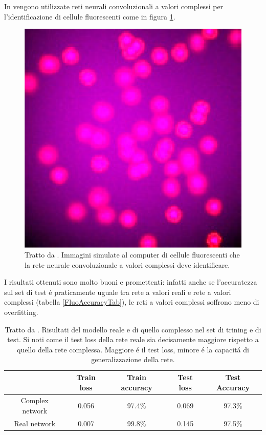 \documentclass[a4paper,12pt]{report}
\begin{document}
 In \cite{guberman2016complex} vengono utilizzate reti neurali convoluzionali a valori complessi per l'identificazione di cellule fluorescenti come in figura \ref{FluoCellpng}.
 \begin{figure}[h!]
  \centering
  \includegraphics[scale=0.35]{FluoCell.png}
  \caption{Tratto da \cite{guberman2016complex}. Immagini simulate al computer di cellule fluorescenti che la rete neurale convoluzionale a valori complessi deve identificare.}
  \label{FluoCellpng}
 \end{figure}
 
 I risultati ottenuti sono molto buoni e promettenti: infatti anche se l'accuratezza sul set di test \'e praticamente uguale tra rete a valori reali e rete a valori complessi (tabella \ref{FluoAccuracyTab}), le reti a valori complessi soffrono meno di overfitting.
 \begin{table}[h]
  \centering
  \begin{tabular}{|c|c|c|c|c|}
   \hline
    & Train loss & Train accuracy & Test loss & Test Accuracy \\
    \hline
    Complex network & 0.056 & 97.4\% & 0.069 & 97.3\% \\
    \hline
    Real network & 0.007 & 99.8\% & 0.145 & 97.5\% \\
    \hline
  \end{tabular}
  \caption{Tratto da \cite{guberman2016complex}. Risultati del modello reale e di quello complesso nel set di trining e di test. Si noti come il test loss della rete reale sia decisamente maggiore rispetto a quello della rete complessa. Maggiore \'e il test loss, minore \'e la capacit\'a di generalizzazione della rete.}
 \end{table}
\end{document}
